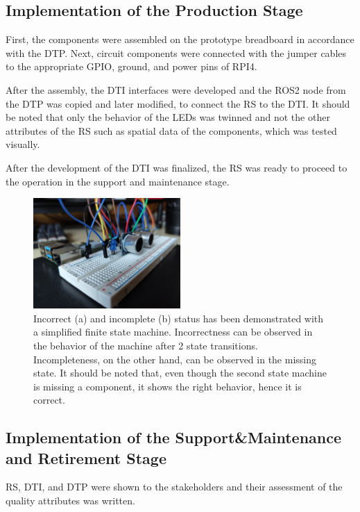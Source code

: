 \documentclass[conference]{IEEEtran}
\begin{document}
    \subsection{Implementation of the Production Stage}

    First, the components were assembled on the prototype breadboard in accordance with the DTP. Next, circuit components were connected with the jumper cables to the appropriate GPIO, ground, and power pins of RPI4. 

    After the assembly, the DTI interfaces were developed and the ROS2 node from the DTP was copied and later modified, to connect the RS to the DTI. It should be noted that only the behavior of the LEDs was twinned and not the other attributes 
    of the RS such as spatial data of the components, which was tested visually.

    After the development of the DTI was finalized, the RS was ready to proceed to the operation in the support and maintenance stage.

    \begin{figure}[htbp]
        \centering
        \includegraphics[width=0.5\textwidth]{Assembled.jpg}
        \caption{Incorrect (a) and incomplete (b) status has been demonstrated with a simplified finite state machine. Incorrectness can be observed in the behavior 
        of the machine after 2 state transitions. Incompleteness, on the other hand, can be observed in the missing state. It should be noted that, even though the second state machine is missing a 
        component, it shows the right behavior, hence it is correct.}\label{fig:Assembled}
    \end{figure}

    \subsection{Implementation of the Support\&Maintenance and Retirement Stage}
    RS, DTI, and DTP were shown to the stakeholders and their assessment of the quality attributes was written.   
\end{document}
